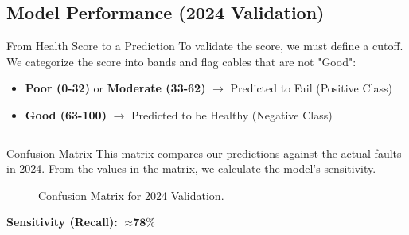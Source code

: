 \documentclass[a4paper,11pt]{article}
\begin{document}
\subsection{Model Performance (2024 Validation)}
\begin{block}{From Health Score to a Prediction}
    To validate the score, we must define a cutoff. We categorize the score into bands and flag cables that are not "Good":
    \begin{itemize}
        \item \textbf{Poor (0-32)} or \textbf{Moderate (33-62)} $\rightarrow$ Predicted to Fail (Positive Class)
        \item \textbf{Good (63-100)} $\rightarrow$ Predicted to be Healthy (Negative Class)
    \end{itemize}
\end{block}
\begin{columns}[T]
    \begin{column}{0.5\textwidth}
        \begin{block}{Confusion Matrix}
        This matrix compares our predictions against the actual faults in 2024. From the values in the matrix, we calculate the model's sensitivity.
        \begin{figure}[h!]
            \centering
            \caption{Confusion Matrix for 2024 Validation.}
        \end{figure}
        \textbf{Sensitivity (Recall):} $\approx \textbf{78\%}$
        \end{block}
    \end{column}
\end{columns}
\end{document}

